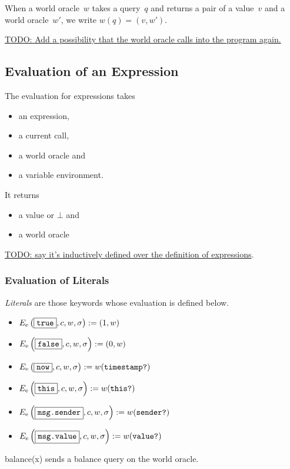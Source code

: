 \documentclass{book}
\newcommand{\todo}[1]{\underline{TODO: {#1}}}
\newcommand{\evalE}[1]{E_\mathrm{e}\left({#1}\right)}
\begin{document}
When a world oracle~$w$ takes a query~$q$ and returns a pair of a value~$v$ and a world oracle~$w'$, we write $w(q) = (v, w')$.

\todo{Add a possibility that the world oracle calls into the program again.}

\subsection{Evaluation of an Expression}

The evaluation for expressions takes
\begin{itemize}
\item an expression,
\item a current call,
\item a world oracle and
\item a variable environment.
\end{itemize}
It returns
\begin{itemize}
\item a value or $\bot$ and
\item a world oracle
\end{itemize}



\todo{say it's inductively defined over the definition of expressions}.

\subsubsection{Evaluation of Literals}

\textit{Literals} are those keywords whose evaluation is defined below.

\begin{itemize}
  \item $\evalE{\boxed{\true}, c, w, \sigma} := (1, w)$
  \item $\evalE{\boxed{\false}, c, w, \sigma} := (0, w)$
  \item $\evalE{\boxed{\now}, c, w, \sigma} := w(\timestampQuery)$
  \item $\evalE{\boxed{\this}, c, w, \sigma} := w(\thisQuery)$
  \item $\evalE{\boxed{\msgsender}, c, w, \sigma} := w(\senderQuery)$
  \item $\evalE{\boxed{\msgvalue}, c, w, \sigma} := w(\valueQuery)$
\end{itemize}

balance(x) sends a balance query on the world oracle.
\end{document}
